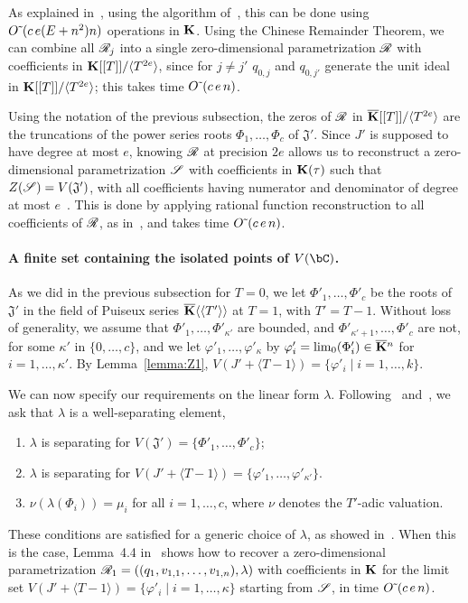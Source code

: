 \documentclass[12pt]{article}
\begin{document}
As explained in~\cite[Section~2.2]{SaSc16}, using the algorithm
of~\cite{GiLeSa01}, this can be done using ${O}{\,\tilde{ }\,}(c\,e (E+n^2)n)$
operations in $\mathbf{K}$.  Using the Chinese Remainder Theorem, we can
combine all $\mathscr{R}_{j}$ into a single zero-dimensional parametrization
$\mathscr{R}$ with coefficients in $\mathbf{K}[[T]]/\langle T^{2e}\rangle$, since
for $j\ne j'$ $q_{0,j}$ and $q_{0,j'}$ generate the unit ideal in
$\mathbf{K}[[T]]/\langle T^{2e}\rangle$; this takes time 
${O}{\,\tilde{ }\,}(c\,e\,n)$.

Using the notation of the previous subsection, the zeros of $\mathscr{R}$ in
$\overline{\mathbf{K}}[[T]]/\langle T^{2e}\rangle$ are the truncations of the power
series roots $\Phi_1,\dots,\Phi_c$ of $\mathfrak{J}'$. Since $J'$ is
supposed to have degree at most $e$, knowing $\mathscr{R}$ at precision $2e$
allows us to reconstruct a zero-dimensional parametrization $\mathscr{S}$
with coefficients in $\mathbf{K}(\tau)$ such that
$Z(\mathscr{S})=V(\mathfrak{J}')$, with all coefficients having numerator
and denominator of degree at most $e$~\cite[Theorem~1]{Schost03}.
This is done by applying rational function reconstruction to all
coefficients of $\mathscr{R}$, as in~\cite{Schost03}, and takes time
${O}{\,\tilde{ }\,}(c\,e\,n)$.


\paragraph{A finite set containing the isolated points of $V(\bC)$.}
As we did in the previous subsection for $T=0$, we let
$\Phi'_1,\dots,\Phi'_c$ be the roots of $\mathfrak{J}'$ in the field
of Puiseux series $\overline{\mathbf{K}}\langle\langle T'\rangle\rangle$ at $T=1$,
with $T'=T-1$. Without loss of generality, we assume that
$\Phi'_1,\dots,\Phi'_{\kappa'}$ are bounded, and
$\Phi'_{\kappa'+1},\dots,\Phi'_c$ are not, for some $\kappa'$ in
$\{0,\dots,c\}$, and we let $\varphi'_1,\dots,\varphi'_\kappa$ by
$\varphi'_i=\lim_0(\Phi'_i)\in\overline{\mathbf{K}}{}^n$ for $i=1,\dots,\kappa'$.  By
Lemma~\ref{lemma:Z1},
$V(J' + \langle T-1\rangle) = \{ \varphi'_i \mid i=1,\dots,k\}$.

We can now specify our requirements on the linear form $\lambda$.
Following~\cite{RRS} and~\cite{SaSc16}, we ask that $\lambda$ is a
{\rm well-separating element},
\begin{enumerate}
\item $\lambda$ is separating for $V(\mathfrak{J}')=\{\Phi'_1,\dots,\Phi'_c\}$;
\item $\lambda$ is separating for $V(J' + \langle T-1\rangle) = \{ \varphi'_1,\dots,\varphi'_{\kappa'}\}$.
\item $\nu(\lambda(\Phi_i)) = \mu_i$ for all $i=1,\dots,c$, where $\nu$ denotes
 the $T'$-adic valuation.
\end{enumerate}
These conditions are satisfied for a generic choice of $\lambda$, as
showed in~\cite{SaSc16}. When this is the case, Lemma~4.4
in~\cite{RRS} shows how to recover a zero-dimensional parametrization
$\mathscr{R}_1=((q_1,v_{1,1},\dots,v_{1,n}),\lambda)$ with coefficients in
$\mathbf{K}$ for the limit set $V(J' + \langle T-1\rangle) =\{\varphi'_i \mid i=1,\dots,\kappa\}$
starting from $\mathscr{S}$, in time 
${O}{\,\tilde{ }\,}(c\,e\,n)$.
\end{document}
